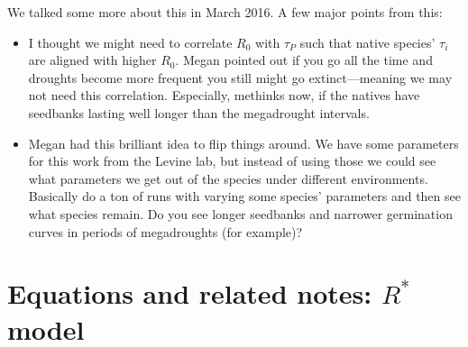 \documentclass[11pt,a4paper,oneside]{article}
\newenvironment{smitemize}{
\begin{itemize}
  \setlength{\itemsep}{1pt}
  \setlength{\parskip}{0pt}
  \setlength{\parsep}{0pt}}
{\end{itemize}
}
\begin{document}
We talked some more about this in March 2016. A few major points from this:
\begin{smitemize}
\item I thought we might need to correlate $R_0$ with $\tau_{P}$ such that native species' $\tau_{i}$ are aligned with higher $R_0$. Megan pointed out if you go all the time and droughts become more frequent you still might go extinct---meaning we may not need this correlation. Especially, methinks now, if the natives have seedbanks lasting well longer than the megadrought intervals.
\item Megan had this brilliant idea to flip things around. We have some parameters for this work from the Levine lab, but instead of using those we could see what parameters we get out of the species under different environments. Basically do a ton of runs with varying some species' parameters and then see what species remain. Do you see longer seedbanks and narrower germination curves in periods of megadroughts (for example)?
\end{smitemize}

\newpage
\section{Equations and related notes: $R^*$ model}
\end{document}
